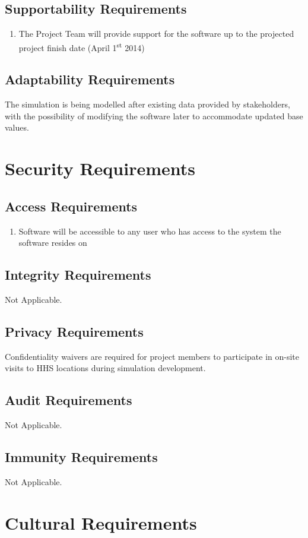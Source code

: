 \documentclass[paper=letter, fontsize=10pt]{scrartcl}
\numberwithin{equation}{section}		%
\numberwithin{figure}{section}			%
\numberwithin{table}{section}				%
\newcommand{\ts}{\textsuperscript}
\begin{document}
\subsection{Supportability Requirements}
	\begin{enumerate}
		\item The Project Team will provide support for the software up to the projected project finish date (April 1\ts{st} 2014)
	\end{enumerate}
\subsection{Adaptability Requirements}
The simulation is being modelled after existing data provided by stakeholders, with the possibility of modifying the software later to accommodate updated base values. 

\section{Security Requirements}
\subsection{Access Requirements}
	\begin{enumerate}
		\item Software will be accessible to any user who has access to the system the software resides on
	\end{enumerate}
\subsection{Integrity Requirements}
Not Applicable.
\subsection{Privacy Requirements}
Confidentiality waivers are required for project members to participate in on-site visits to HHS locations during simulation development.
\subsection{Audit Requirements}
Not Applicable.
\subsection{Immunity Requirements}
Not Applicable.

\section{Cultural Requirements}
\end{document}
